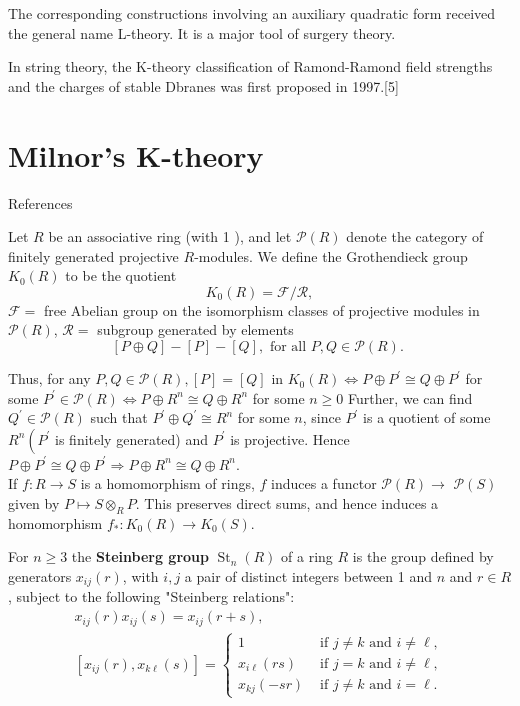 The corresponding constructions involving an auxiliary quadratic form received the general name L-theory. It is a major tool of surgery theory.

In string theory, the K-theory classification of Ramond-Ramond field strengths and the charges of stable Dbranes was first proposed in 1997.[5]


\chapter{Milnor's K-theory}
References \cite{srinivasAlgebraicKTheory1996}

Let $R$ be an associative ring (with 1 ), and let $\mathcal{P}(R)$ denote the category of finitely generated projective $R$-modules. We define the Grothendieck group $K_0(R)$ to be the quotient
$$
K_0(R)=\mathcal{F} / \mathcal{R},
$$
$\mathcal{F}=$ free Abelian group on the isomorphism classes of projective modules in $\mathcal{P}(R)$,
$\mathcal{R}=$ subgroup generated by elements
$$
[P \oplus Q]-[P]-[Q], \text { for all } P, Q \in \mathcal{P}(R) \text {. }
$$

Thus, for any $P, Q \in \mathcal{P}(R),[P]=[Q]$ in $K_0(R) \Longleftrightarrow P \oplus P^{\prime} \cong Q \oplus P^{\prime}$ for some $P^{\prime} \in \mathcal{P}(R) \Longleftrightarrow P \oplus R^n \cong Q \oplus R^n$ for some $n \geq 0$ Further, we can find $Q^{\prime} \in \mathcal{P}(R)$ such that $P^{\prime} \oplus Q^{\prime} \cong R^n$ for some $n$, since $P^{\prime}$ is a quotient of some $R^n\left(P^{\prime}\right.$ is finitely generated) and $P^{\prime}$ is projective. Hence $P \oplus P^{\prime} \cong Q \oplus P^{\prime} \Longrightarrow P \oplus R^n \cong Q \oplus R^n$.\\
If $f: R \rightarrow S$ is a homomorphism of rings, $f$ induces a functor $\mathcal{P}(R) \rightarrow$ $\mathcal{P}(S)$ given by $P \longmapsto S \otimes_R P$. This preserves direct sums, and hence induces a homomorphism $f_*: K_0(R) \rightarrow K_0(S)$.




\newpage
For $n \geq 3$ the \textbf{Steinberg group} $\operatorname{St}_n(R)$ of a ring $R$ is the group defined by generators $x_{i j}(r)$, with $i, j$ a pair of distinct integers between 1 and $n$ and $r \in R$, subject to the following "Steinberg relations":
$$
\begin{gathered}
x_{i j}(r) x_{i j}(s)=x_{i j}(r+s), \\
{\left[x_{i j}(r), x_{k \ell}(s)\right]= \begin{cases}1 & \text { if } j \neq k \text { and } i \neq \ell, \\
x_{i \ell}(r s) & \text { if } j=k \text { and } i \neq \ell, \\
x_{k j}(-s r) & \text { if } j \neq k \text { and } i=\ell .\end{cases} }
\end{gathered}
$$

